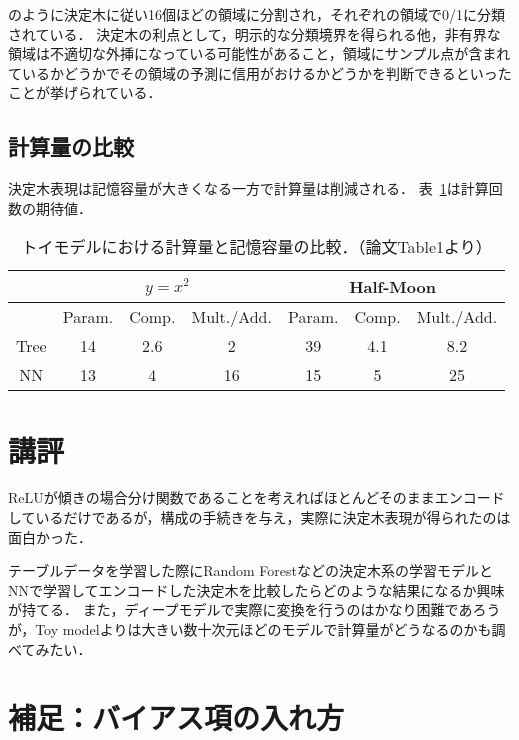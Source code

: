 \documentclass[dvipdfmx,autodetect-engine,12pt,fleqn]{jsarticle}
\begin{document}
のように決定木に従い16個ほどの領域に分割され，それぞれの領域で0/1に分類されている．
決定木の利点として，明示的な分類境界を得られる他，非有界な領域は不適切な外挿になっている可能性があること，領域にサンプル点が含まれているかどうかでその領域の予測に信用がおけるかどうかを判断できるといったことが挙げられている．


\subsection{計算量の比較}

決定木表現は記憶容量が大きくなる一方で計算量は削減される．
表~\ref{tab:comp}は計算回数の期待値．

\begin{table}[hb]
\begin{tabular}{|c|c|c|c|c|c|c|}
 \hline
   & \multicolumn{3}{|c|}{$y=x^2$} & \multicolumn{3}{|c|}{Half-Moon} \\
 \hline
   & Param. & Comp. & Mult./Add. & Param. & Comp. & Mult./Add. \\
 \hline
  Tree & 14 & 2.6 & 2 & 39 & 4.1 & 8.2 \\
 \hline
  NN &  13 & 4 & 16 & 15 & 5 & 25 \\
 \hline
\end{tabular}
\caption{\label{tab:comp}トイモデルにおける計算量と記憶容量の比較．（論文Table1より）}
\end{table}

\section{講評}

ReLUが傾きの場合分け関数であることを考えればほとんどそのままエンコードしているだけであるが，構成の手続きを与え，実際に決定木表現が得られたのは面白かった．

テーブルデータを学習した際にRandom Forestなどの決定木系の学習モデルとNNで学習してエンコードした決定木を比較したらどのような結果になるか興味が持てる．
また，ディープモデルで実際に変換を行うのはかなり困難であろうが，Toy modelよりは大きい数十次元ほどのモデルで計算量がどうなるのかも調べてみたい．

\section*{補足：バイアス項の入れ方}
\end{document}
